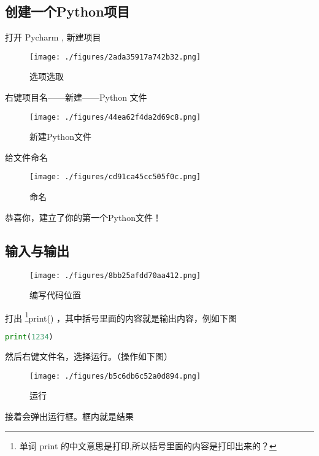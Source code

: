 
\subsection{创建一个Python项目}

打开 Pycharm , 新建项目

\begin{figure}[ht]
\centering
\texttt{[image: ./figures/2ada35917a742b32.png]}
\caption{选项选取} \label{fig_Pyc2_2}
\end{figure}

右键项目名——新建——Python 文件

\begin{figure}[ht]
\centering
\texttt{[image: ./figures/44ea62f4da2d69c8.png]}
\caption{新建Python文件} \label{fig_Pyc2_1}
\end{figure}

给文件命名

\begin{figure}[ht]
\centering
\texttt{[image: ./figures/cd91ca45cc505f0c.png]}
\caption{命名} \label{fig_Pyc2_3}
\end{figure}

恭喜你，建立了你的第一个Python文件！

\subsection{输入与输出}

\begin{figure}[ht]
\centering
\texttt{[image: ./figures/8bb25afdd70aa412.png]}
\caption{编写代码位置} \label{fig_Pyc2_4}
\end{figure}

打出 \footnote{单词 print 的中文意思是打印,所以括号里面的内容是打印出来的？}print() ，其中括号里面的内容就是输出内容，例如下图

\begin{lstlisting}[language=python]
print(1234)
\end{lstlisting}

然后右键文件名，选择运行。（操作如下图）

\begin{figure}[ht]
\centering
\texttt{[image: ./figures/b5c6db6c52a0d894.png]}
\caption{运行} \label{fig_Pyc2_5}
\end{figure}

接着会弹出运行框。框内就是结果

